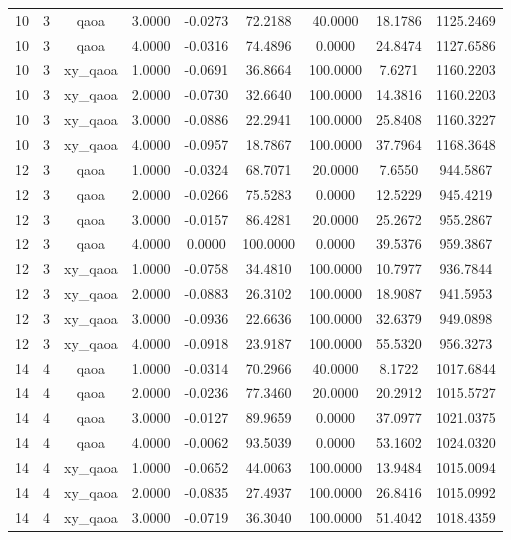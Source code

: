\begin{table}[htbp]
\begin{tabular}{ccccccccc}
    10 & 3 & qaoa & 3.0000 & -0.0273 & 72.2188 & 40.0000 & 18.1786 & 1125.2469 \\
    10 & 3 & qaoa & 4.0000 & -0.0316 & 74.4896 & 0.0000 & 24.8474 & 1127.6586 \\
    10 & 3 & xy\_qaoa & 1.0000 & -0.0691 & 36.8664 & 100.0000 & 7.6271 & 1160.2203 \\
    10 & 3 & xy\_qaoa & 2.0000 & -0.0730 & 32.6640 & 100.0000 & 14.3816 & 1160.2203 \\
    10 & 3 & xy\_qaoa & 3.0000 & -0.0886 & 22.2941 & 100.0000 & 25.8408 & 1160.3227 \\
    10 & 3 & xy\_qaoa & 4.0000 & -0.0957 & 18.7867 & 100.0000 & 37.7964 & 1168.3648 \\
    12 & 3 & qaoa & 1.0000 & -0.0324 & 68.7071 & 20.0000 & 7.6550 & 944.5867 \\
    12 & 3 & qaoa & 2.0000 & -0.0266 & 75.5283 & 0.0000 & 12.5229 & 945.4219 \\
    12 & 3 & qaoa & 3.0000 & -0.0157 & 86.4281 & 20.0000 & 25.2672 & 955.2867 \\
    12 & 3 & qaoa & 4.0000 & 0.0000 & 100.0000 & 0.0000 & 39.5376 & 959.3867 \\
    12 & 3 & xy\_qaoa & 1.0000 & -0.0758 & 34.4810 & 100.0000 & 10.7977 & 936.7844 \\
    12 & 3 & xy\_qaoa & 2.0000 & -0.0883 & 26.3102 & 100.0000 & 18.9087 & 941.5953 \\
    12 & 3 & xy\_qaoa & 3.0000 & -0.0936 & 22.6636 & 100.0000 & 32.6379 & 949.0898 \\
    12 & 3 & xy\_qaoa & 4.0000 & -0.0918 & 23.9187 & 100.0000 & 55.5320 & 956.3273 \\
    14 & 4 & qaoa & 1.0000 & -0.0314 & 70.2966 & 40.0000 & 8.1722 & 1017.6844 \\
    14 & 4 & qaoa & 2.0000 & -0.0236 & 77.3460 & 20.0000 & 20.2912 & 1015.5727 \\
    14 & 4 & qaoa & 3.0000 & -0.0127 & 89.9659 & 0.0000 & 37.0977 & 1021.0375 \\
    14 & 4 & qaoa & 4.0000 & -0.0062 & 93.5039 & 0.0000 & 53.1602 & 1024.0320 \\
    14 & 4 & xy\_qaoa & 1.0000 & -0.0652 & 44.0063 & 100.0000 & 13.9484 & 1015.0094 \\
    14 & 4 & xy\_qaoa & 2.0000 & -0.0835 & 27.4937 & 100.0000 & 26.8416 & 1015.0992 \\
    14 & 4 & xy\_qaoa & 3.0000 & -0.0719 & 36.3040 & 100.0000 & 51.4042 & 1018.4359 \\

\end{tabular}
\end{table}
